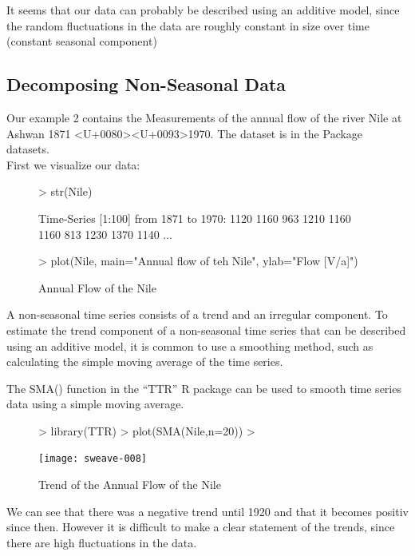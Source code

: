 \documentclass[11pt, a4paper]{article} %
\begin{document}
It seems that our data can probably be described using an additive model, since the random fluctuations in the data are roughly constant in size over time (constant seasonal component)


\subsection{Decomposing Non-Seasonal Data}%

Our example 2 contains the Measurements of the annual flow of the river Nile at Ashwan 1871 \- <U+0080><U+0093>1970. The dataset is in the Package {datasets}. \\
First we visualize our data:
\begin{figure}
\centering
\begin{Schunk}
\begin{Sinput}
> str(Nile)
\end{Sinput}
\begin{Soutput}
 Time-Series [1:100] from 1871 to 1970: 1120 1160 963 1210 1160 1160 813 1230 1370 1140 ...
\end{Soutput}
\begin{Sinput}
> plot(Nile, main="Annual flow of teh Nile", ylab="Flow [V/a]")
\end{Sinput}
\end{Schunk}
\caption{Annual Flow of the Nile}
\end{figure}

A non-seasonal time series consists of a trend and an irregular component. 
To estimate the trend component of a non-seasonal time series that can be described using an additive model, it is common to use a smoothing method, such as calculating the simple moving average of the time series.

The SMA() function in the “TTR” R package can be used to smooth time series data using a simple moving average. 
\begin{figure}
\centering
\begin{Schunk}
\begin{Sinput}
> library(TTR)
> plot(SMA(Nile,n=20))
> 
\end{Sinput}
\end{Schunk}
\texttt{[image: sweave-008]}
\caption{Trend of the Annual Flow of the Nile}
\end{figure}
We can see that there was a negative trend until 1920 and that it becomes positiv since then. However it is difficult to make a clear statement of the trends, since there are high fluctuations in the data.
\end{document}
